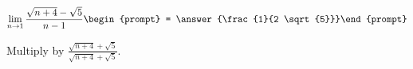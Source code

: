 \documentclass{ximera}
\author{Bart Snapp}
\begin{document}
\begin{exercise}

\[
\lim_{n\to 1 } \frac{\sqrt{n+4}-\sqrt{5}}{n-1}\begin{prompt} = \answer{\frac{1}{2 \sqrt{5}}}\end{prompt}
\]
\begin{hint}
Multiply by $\frac{\sqrt{n+4}+\sqrt{5}}{\sqrt{n+4}+\sqrt{5}}$.
\end{hint}
\end{exercise}
\end{document}
